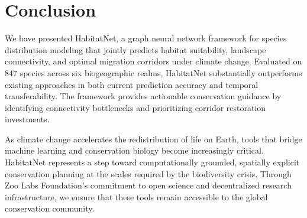 \documentclass[11pt,a4paper]{article}
\begin{document}
\section{Conclusion}
\label{sec:conclusion}

We have presented HabitatNet, a graph neural network framework for
species distribution modeling that jointly predicts habitat suitability,
landscape connectivity, and optimal migration corridors under climate
change. Evaluated on 847 species across six biogeographic realms,
HabitatNet substantially outperforms existing approaches in both current
prediction accuracy and temporal transferability. The framework provides
actionable conservation guidance by identifying connectivity bottlenecks
and prioritizing corridor restoration investments.

As climate change accelerates the redistribution of life on Earth, tools
that bridge machine learning and conservation biology become increasingly
critical. HabitatNet represents a step toward computationally grounded,
spatially explicit conservation planning at the scales required by the
biodiversity crisis. Through Zoo Labs Foundation's commitment to open
science and decentralized research infrastructure, we ensure that these
tools remain accessible to the global conservation community.




\end{document}
